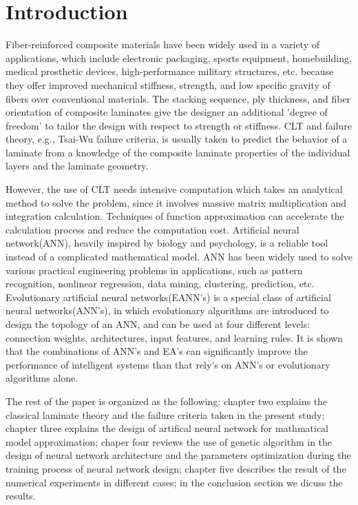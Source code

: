 \section{Introduction}
Fiber-reinforced composite materials have been widely used in a variety of
applications, which include electronic packaging, sports equipment,
homebuilding, medical prosthetic devices, high-performance military
structures, etc. because they offer improved mechanical stiffness, strength,
and low specific gravity of fibers over conventional materials.  The stacking
sequence, ply thickness, and fiber orientation of composite laminates give the
designer an additional ’degree of freedom’ to tailor the design with respect to
strength or stiffness. CLT and failure theory, e.g., Tsai-Wu failure criteria,
is usually taken to predict the behavior of a laminate from a knowledge of the
composite laminate properties of the individual layers and the laminate
geometry.

However, the use of CLT needs intensive computation which takes an analytical
method to solve the problem, since it involves massive matrix multiplication
and integration calculation. Techniques of function approximation can
accelerate the calculation process and reduce the computation cost.  Artificial
neural network(ANN), heavily inspired by biology and psychology, is a reliable
tool instead of a complicated mathematical model. ANN has been widely used to
solve various practical engineering problems in applications, such as pattern
recognition, nonlinear regression, data mining, clustering,  prediction, etc.
Evolutionary artificial neural networks(EANN's) is a special class of
artificial neural networks(ANN's), in which evolutionary algorithms are
introduced to design the topology of an ANN, and can be used at four different
levels: connection weights, architectures, input features, and learning rules.
It is shown that the combinations of ANN's and EA's can significantly improve
the performance of intelligent systems than that rely's on ANN's or
evolutionary algorithms alone.

The rest of the paper is organized as the following: chapter two explains the
classical laminate theory and the failure criteria taken in the present study;
chapter three explains the design of artifical neural network for mathmatical
model approximation; chaper four reviews the use of genetic algorithm in the
design of neural network architecture and the parameters optimization during
the training process of neural network design;  chapter five describes the result
of the numerical experiments in different cases; in the conclusion section
we dicuss the results.

